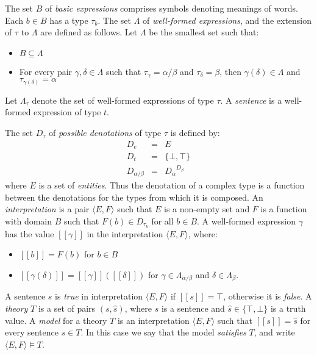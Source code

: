 \documentclass[manuscript]{clv2}
\newcommand{\interp}[1]{[\![ #1 ]\!]}
\begin{document}
The set $B$ of \emph{basic expressions} comprises
symbols denoting meanings of words. Each $b\in B$ has a type $\tau_b$. The set $\Lambda$ of
\emph{well-formed expressions}, and the extension of $\tau$ to $\Lambda$ are
defined as follows. Let $\Lambda$ be the smallest set such that:

\begin{itemize}
\item $B\subseteq \Lambda$
\item For every pair $\gamma,\delta\in \Lambda$ such that $\tau_\gamma
  = \alpha/\beta$ and $\tau_\delta = \beta$, then $\gamma(\delta)\in
  \Lambda$ and $\tau_{\gamma(\delta)} = \alpha$
\end{itemize}
Let $\Lambda_\tau$ denote the set of well-formed expressions of type
$\tau$. A \emph{sentence} is a well-formed expression of type $t$.


The set $D_\tau$ of \emph{possible denotations} of type $\tau$ is
defined by:
\begin{eqnarray*}
D_e &=& E\\
D_t &=& \{\bot,\top\}\\
D_{\alpha/\beta} &=& {D_\alpha}^{D_\beta}
\end{eqnarray*}
where $E$ is a set of \emph{entities}. Thus the denotation of a
complex type is a function between the denotations for the types from
which it is composed. An \emph{interpretation} is a pair $\langle E,
F\rangle$ such that $E$ is a non-empty set and $F$ is a function with
domain $B$ such that $F(b) \in D_{\tau_b}$ for all $b\in B$. A well-formed expression $\gamma$ has the value $\interp{\gamma}$ in the
interpretation $\langle E, F\rangle$, where:
\begin{itemize}
\item $\interp{b} = F(b)$ for $b\in B$
\item $\interp{\gamma(\delta)} = \interp{\gamma}(\interp{\delta})$ for $\gamma
  \in \Lambda_{\alpha/\beta}$ and $\delta \in \Lambda_\beta$.
\end{itemize}
A sentence $s$ is \emph{true} in interpretation $\langle E, F\rangle$
if $\interp{s} = \top$, otherwise it is \emph{false}. A \emph{theory} $T$ is a set of pairs $(s,\hat{s})$, where $s$ is a
sentence and $\hat{s}\in\{\top,\bot\}$ is a truth value. A
\emph{model} for a theory $T$ is an interpretation $\langle E,
F\rangle$ such that $\interp{s} = \hat{s}$ for every sentence $s\in
T$. In this case we say that the model \emph{satisfies} $T$, and write
$\langle E, F\rangle \models T$.
\end{document}
